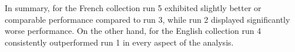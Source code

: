 In summary, for the French collection run 5 exhibited slightly better or comparable performance compared to run 3, while run 2 displayed significantly worse performance. 
On the other hand, for the English collection run 4 consistently outperformed run 1 in every aspect of the analysis.

































